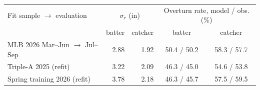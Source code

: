 \begin{tabular}{lrrcc}
\toprule
Fit sample $\to$ evaluation & \multicolumn{2}{c}{$\sigma_r$ (in)} & \multicolumn{2}{c}{Overturn rate, model / obs. (\%)} \\
 & batter & catcher & batter & catcher \\
\midrule
MLB 2026 Mar--Jun $\to$ Jul--Sep & 2.88 & 1.92 & 50.4 / 50.2 & 58.3 / 57.7 \\
Triple-A 2025 (refit) & 3.22 & 2.09 & 46.3 / 45.0 & 54.6 / 53.8 \\
Spring training 2026 (refit) & 3.78 & 2.18 & 46.3 / 45.7 & 57.5 / 59.5 \\
\bottomrule
\end{tabular}
